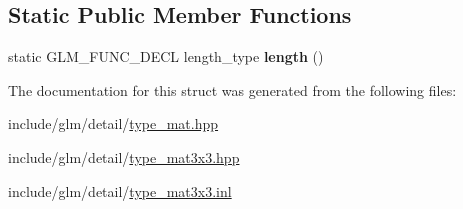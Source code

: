 \subsection*{Static Public Member Functions}
\begin{DoxyCompactItemize}
\item 
\mbox{\label{structglm_1_1tmat3x3_a4dd8598cc33aa07fe94fb019c8ac79cf}} 
static G\+L\+M\+\_\+\+F\+U\+N\+C\+\_\+\+D\+E\+CL length\+\_\+type {\bfseries length} ()
\end{DoxyCompactItemize}


The documentation for this struct was generated from the following files\+:\begin{DoxyCompactItemize}
\item 
include/glm/detail/\hyperlink{type__mat_8hpp}{type\+\_\+mat.\+hpp}\item 
include/glm/detail/\hyperlink{type__mat3x3_8hpp}{type\+\_\+mat3x3.\+hpp}\item 
include/glm/detail/\hyperlink{type__mat3x3_8inl}{type\+\_\+mat3x3.\+inl}\end{DoxyCompactItemize}
